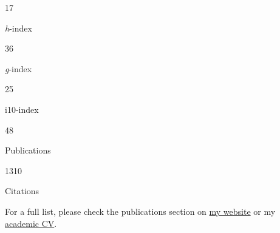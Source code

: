 \documentclass[11pt,a4paper,]{awesome-cv}
\begin{document}
\begin{tcolorbox}[enhanced,
  on line,
  boxsep=4pt, left=0pt,right=0pt,top=0pt,bottom=0pt,
  colframe=white,colback=teal,
  hyperurl={https://scholar.google.com/citations?user=8Q0jKHsAAAAJ}]
\color{white}
\begin{minipage}[c]{0.195\linewidth}
  \begin{center} \begin{huge} 17 \end{huge}
  \begin{small} \textit{h}-index \end{small} \end{center}
\end{minipage} \begin{minipage}[c]{0.195\linewidth}
  \begin{center} \begin{huge} 36 \end{huge}
  \begin{small} \textit{g}-index \end{small} \end{center}
\end{minipage} \begin{minipage}[c]{0.195\linewidth}
  \begin{center} \begin{huge} 25 \end{huge}
  \begin{small} i10-index \end{small} \end{center}
\end{minipage} \begin{minipage}[c]{0.195\linewidth}
  \begin{center} \begin{huge} 48 \end{huge}
  \begin{small} Publications \end{small} \end{center}
\end{minipage} \begin{minipage}[c]{0.195\linewidth}
  \begin{center} \begin{huge} 1310 \end{huge}
  \begin{small} Citations \end{small} \end{center}
\end{minipage}
\end{tcolorbox}

For a full list, please check the publications section on
\href{https://jdleongomez.info/en/publication/}{my website} or my
\href{https://jdleongomez.github.io/JDL_CV/CV_eng/JDL_CV_en.pdf}{academic
CV}.
\end{document}

